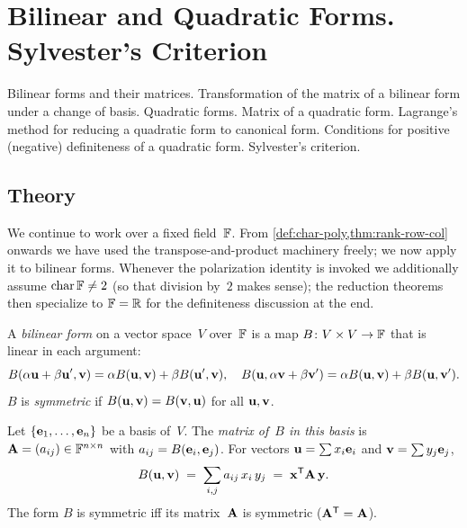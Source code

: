 
\section{Bilinear and Quadratic Forms. Sylvester's Criterion}
\label{sec:1.1.07-quadratic-forms}

\begin{ticket}
Bilinear forms and their matrices. Transformation of the matrix of a bilinear form under a change of basis. Quadratic forms. Matrix of a quadratic form. Lagrange's method for reducing a quadratic form to canonical form. Conditions for positive (negative) definiteness of a quadratic form. Sylvester's criterion.
\end{ticket}

\subsection*{Theory}

We continue to work over a fixed field~$\mathbb{F}$. From
\cref{def:char-poly,thm:rank-row-col} onwards we have used the
transpose-and-product machinery freely; we now apply it to bilinear
forms. Whenever the polarization identity is invoked we additionally
assume $\operatorname{char} \mathbb{F} \neq 2$ (so that division by~$2$ makes
sense); the reduction theorems then specialize to $\mathbb{F} = \mathbb{R}$ for the
definiteness discussion at the end.

\begin{definition}
\label{def:bilinear-form}
A \emph{bilinear form} on a vector space~$V$ over~$\mathbb{F}$ is a map
$B \colon V \times V \to \mathbb{F}$ that is linear in each argument:
\[
  B(\alpha \mathbf{u} + \beta \mathbf{u}', \mathbf{v}) = \alpha B(\mathbf{u}, \mathbf{v}) + \beta B(\mathbf{u}', \mathbf{v}),
  \quad
  B(\mathbf{u}, \alpha \mathbf{v} + \beta \mathbf{v}') = \alpha B(\mathbf{u}, \mathbf{v}) + \beta B(\mathbf{u}, \mathbf{v}').
\]
$B$ is \emph{symmetric} if $B(\mathbf{u}, \mathbf{v}) = B(\mathbf{v}, \mathbf{u})$
for all $\mathbf{u}, \mathbf{v}$.
\end{definition}

\begin{definition}
\label{def:matrix-bilinear}
Let $\{\mathbf{e}_1, \dots, \mathbf{e}_n\}$ be a basis of~$V$. The
\emph{matrix of~$B$ in this basis} is
$\mathbf{A} = (a_{ij}) \in \mathbb{F}^{n \times n}$ with $a_{ij} = B(\mathbf{e}_i, \mathbf{e}_j)$.
For vectors $\mathbf{u} = \sum x_i \mathbf{e}_i$ and $\mathbf{v} = \sum y_j \mathbf{e}_j$,
\[
  B(\mathbf{u}, \mathbf{v}) \;=\; \sum_{i, j} a_{ij}\, x_i\, y_j \;=\; \mathbf{x}^{\mathsf{T}} \mathbf{A}\, \mathbf{y}.
\]
The form $B$ is symmetric iff its matrix~$\mathbf{A}$ is symmetric
($\mathbf{A}^{\mathsf{T}} = \mathbf{A}$).
\end{definition}

